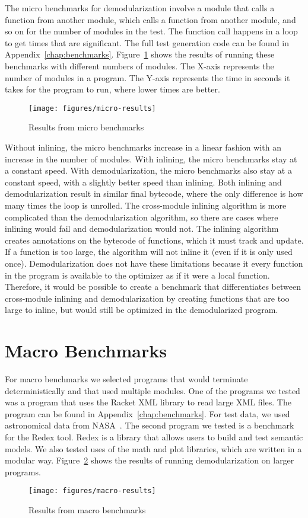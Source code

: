 The micro benchmarks for demodularization involve a module that calls a function from another module, which calls a function from another module, and so on for the number of modules in the test. 
The function call happens in a loop to get times that are significant.
The full test generation code can be found in Appendix~\ref{chap:benchmarks}.
Figure~\ref{fig:micro-results} shows the results of running these benchmarks with different numbers of modules.
The X-axis represents the number of modules in a program.
The Y-axis represents the time in seconds it takes for the program to run, where lower times are better.
\begin{figure}
\texttt{[image: figures/micro-results]}
\caption{Results from micro benchmarks}
\label{fig:micro-results}
\end{figure}
Without inlining, the micro benchmarks increase in a linear fashion with an increase in the number of modules.
With inlining, the micro benchmarks stay at a constant speed.
With demodularization, the micro benchmarks also stay at a constant speed, with a slightly better speed than inlining.
Both inlining and demodularization result in similar final bytecode, where the only difference is how many times the loop is unrolled.
The cross-module inlining algorithm is more complicated than the demodularization algorithm, so there are cases where inlining would fail and demodularization would not. 
The inlining algorithm creates annotations on the bytecode of functions, which it must track and update.
If a function is too large, the algorithm will not inline it (even if it is only used once). 
Demodularization does not have these limitations because it every function in the program is available to the optimizer as if it were a local function. 
Therefore, it would be possible to create a benchmark that differentiates between cross-module inlining and demodularization by creating functions that are too large to inline, but would still be optimized in the demodularized program.

\section{Macro Benchmarks}
For macro benchmarks we selected programs that would terminate deterministically and that used multiple modules.
One of the programs we tested was a program that uses the Racket XML library to read large XML files.
The program can be found in Appendix~\ref{chap:benchmarks}.
For test data, we used astronomical data from NASA~\cite{nasa}. 
The second program we tested is a benchmark for the Redex tool.
Redex is a library that allows users to build and test semantic models.
We also tested uses of the math and plot libraries, which are written in a modular way. 
Figure~\ref{fig:macro-results} shows the results of running demodularization on larger programs.
\begin{figure}
\texttt{[image: figures/macro-results]}
\caption{Results from macro benchmarks}
\label{fig:macro-results}
\end{figure}

